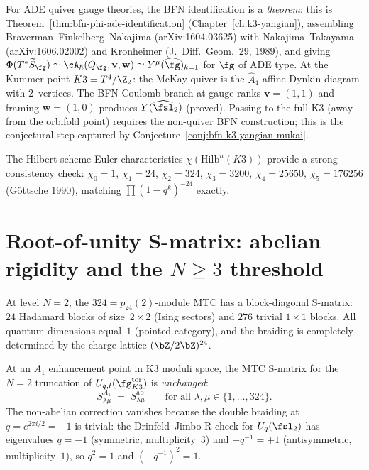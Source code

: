 \begin{remark}
\label{rem:bfn-ade-proved}
For ADE quiver gauge theories, the BFN identification is a
\emph{theorem}: this is Theorem~\ref{thm:bfn-phi-ade-identification}
(Chapter~\ref{ch:k3-yangian}), assembling Braverman--Finkelberg--Nakajima
(arXiv:1604.03625) with Nakajima--Takayama (arXiv:1606.02002) and Kronheimer
(J.~Diff.~Geom.\ 29, 1989), and giving
$\Phi(T^*\widetilde{S}_\fg) \simeq \cA_\hbar(Q_\fg, \mathbf{v}, \mathbf{w})
\simeq Y^\mu(\widehat{\fg})_{k=1}$ for $\fg$ of ADE type.
At the Kummer point $K3 = T^4/\Z_2$: the McKay quiver is the
$\widehat{A}_1$ affine Dynkin diagram with $2$~vertices. The
BFN Coulomb branch at gauge ranks $\mathbf{v} = (1, 1)$ and
framing $\mathbf{w} = (1, 0)$ produces $Y(\widehat{\fsl}_2)$
(proved). Passing to the full K3 (away from the orbifold point)
requires the non-quiver BFN construction; this is the conjectural
step captured by Conjecture~\ref{conj:bfn-k3-yangian-mukai}.

The Hilbert scheme Euler characteristics $\chi(\mathrm{Hilb}^n(K3))$
provide a strong consistency check: $\chi_0 = 1$, $\chi_1 = 24$,
$\chi_2 = 324$, $\chi_3 = 3200$, $\chi_4 = 25650$, $\chi_5 = 176256$
(G\"ottsche 1990), matching $\prod(1 - q^k)^{-24}$ exactly.
\end{remark}

\section{Root-of-unity S-matrix: abelian rigidity and the \texorpdfstring{$N \geq 3$}{N >= 3} threshold}
\label{sec:root-unity-smatrix}

At level $N = 2$, the $324 = p_{24}(2)$-module MTC
has a block-diagonal S-matrix: $24$ Hadamard blocks of size~$2 \times 2$
(Ising sectors) and $276$ trivial $1 \times 1$ blocks.
All quantum dimensions equal~$1$ (pointed category), and the braiding
is completely determined by the charge lattice $(\bZ/2\bZ)^{24}$.

\begin{conjecture}[Non-abelian S-matrix rigidity at \texorpdfstring{$N = 2$}{N = 2}]
\label{conj:n2-smatrix-rigidity}
\ClaimStatusConjectured
At an $A_1$ enhancement point in K3 moduli space, the MTC S-matrix
for the $N = 2$ truncation of $U_{q,t}(\fg_{K3}^{\mathrm{tor}})$ is
\emph{unchanged}:
\[
 S^{A_1}_{\lambda\mu} \;=\; S^{\mathrm{ab}}_{\lambda\mu}
 \qquad\text{for all } \lambda,\mu \in \{1,\ldots,324\}.
\]
The non-abelian correction vanishes because the double braiding
at $q = e^{2\pi i/2} = -1$ is trivial: the Drinfeld--Jimbo
R-check for $U_q(\fsl_2)$ has eigenvalues $q = -1$ (symmetric,
multiplicity~$3$) and $-q^{-1} = +1$ (antisymmetric, multiplicity~$1$),
so $q^2 = 1$ and $(-q^{-1})^2 = 1$.
\end{conjecture}

